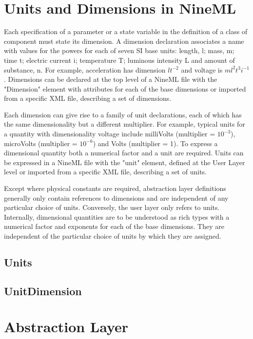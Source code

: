 \documentclass[draftspec]{ninemlspec}
\begin{document}
\section{Units and Dimensions in NineML}
\label{sec:dimensions}

\noindent
Each specification of a parameter or a state variable in the definition of
a class of component must state its dimension. A dimension declaration
associates a name with values for the powers for each of seven SI base
units: length, l; mass, m; time t; electric current i; temperature T;
luminous intensity L and amount of substance, n.
For example, acceleration has dimension $lt^{-2}$ and voltage is
$ml^2t^3i^{-1}$.
Dimensions can be declared at the top level of a NineML file with
the "Dimension" element with attributes for each of the base dimensions or
imported from a specific XML file, describing a set of dimensions.

Each dimension can give rise to a family of unit declarations, each of
which has the same dimensionality but a different multiplier. For example,
typical units for a quantity with dimensionality voltage include
milliVolts (multiplier = $10^{-3}$), microVolts (multiplier = $10^{-6}$)
and Volts (multiplier = 1).  To express a dimensional quantity both a
numerical factor and a unit are required. Units can be expressed in a NineML
file with the "unit" element, defined at the User Layer level or imported
from a specific XML file, describing a set of units.

Except where physical constants are required, abstraction layer definitions
generally only contain references to dimensions and are independent of any
particular choice of units. Conversely, the user layer only refers to units.
Internally, dimensional quantities are to be understood
as rich types with a numerical factor and exponents for each of the
base dimensions. They are independent of the particular choice of
units by which they are assigned.

\subsection{Units}
\label{sec:Units}


\subsection{UnitDimension}
\label{sec:UnitDimension}

\section{Abstraction Layer}
\label{AbstractionL}
\end{document}
